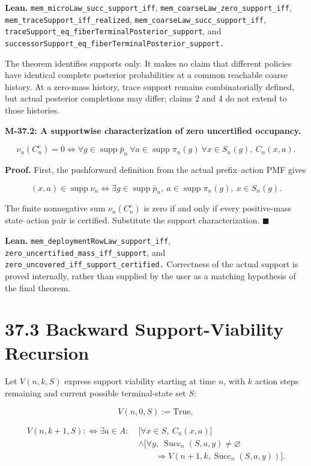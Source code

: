 \documentclass[
  english,
  11pt,
  oneside]{book}
\begin{document}
\textbf{Lean.} \nolinkurl{mem_microLaw_succ_support_iff}, \nolinkurl{mem_coarseLaw_zero_support_iff}, \nolinkurl{mem_traceSupport_iff_realized}, \nolinkurl{mem_coarseLaw_succ_support_iff}, \nolinkurl{traceSupport_eq_fiberTerminalPosterior_support}, and \nolinkurl{successorSupport_eq_fiberTerminalPosterior_support.}

The theorem identifies supports only. It makes no claim that different policies have identical complete posterior probabilities at a common reachable coarse history. At a zero-mass history, trace support remains combinatorially defined, but actual posterior completions may differ; claims 2 and 4 do not extend to those histories.

\hypertarget{m-37-2}{}\label{m-37-2}

\textbf{M-37.2: A supportwise characterization of zero uncertified occupancy.}

\[\nu_n(C_n^c)=0
\iff
\forall g\in\operatorname{supp}\bar p_n\
\forall a\in\operatorname{supp}\pi_n(g)\
\forall x\in S_n(g),\ C_n(x,a).\]

\textbf{Proof.} First, the pushforward definition from the actual prefix--action PMF gives

\[(x,a)\in\operatorname{supp}\nu_n
\iff
\exists g\in\operatorname{supp}\bar p_n,\
a\in\operatorname{supp}\pi_n(g),\ x\in S_n(g).\]

The finite nonnegative sum \(\nu_n(C_n^c)\) is zero if and only if every positive-mass state--action pair is certified. Substitute the support characterization. \(\blacksquare\)

\textbf{Lean.} \nolinkurl{mem_deploymentRowLaw_support_iff}, \nolinkurl{zero_uncertified_mass_iff_support}, and \nolinkurl{zero_uncovered_iff_support_certified.} Correctness of the actual support is proved internally, rather than supplied by the user as a matching hypothesis of the final theorem.

\section{37.3 Backward Support-Viability Recursion}\label{backward-support-viability-recursion}

Let \(V(n,k,S)\) express support viability starting at time \(n\), with \(k\) action steps remaining and current possible terminal-state set \(S\):

\[V(n,0,S):=\mathrm{True},\]

\[\begin{aligned}
V(n,k+1,S):\iff \exists a\in A:\;&
\bigl[\forall x\in S,\ C_n(x,a)\bigr]\\
&\land
\bigl[\forall y,\ \operatorname{Succ}_n(S,a,y)\ne\varnothing
\\
&\qquad \Rightarrow V(n+1,k,\operatorname{Succ}_n(S,a,y))\bigr].
\end{aligned}\]
\end{document}
